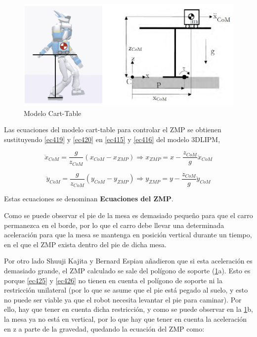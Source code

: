 \begin{figure}[H]
\centering
\includegraphics[scale=0.5]{imagenes/apartado_4/46_cart_table_model_2}
\caption{Modelo Cart-Table}
\label{figura46}
\end{figure}

Las ecuaciones del modelo cart-table para controlar el ZMP se obtienen sustituyendo \ref{ec419} y \ref{ec420} en \ref{ec415} y \ref{ec416} del modelo 3DLIPM,

\begin{equation}
\ddot{x}_{CoM}=\frac{g}{z_{CoM}}\left ( x_{CoM} - x_{ZMP} \right )\Rightarrow x_{ZMP} = x-\frac{z_{CoM}}{g}\ddot{x}_{CoM}
\label{ec425}
\end{equation}

\begin{equation}
\ddot{y}_{CoM}=\frac{g}{z_{CoM}}\left ( y_{CoM} - y_{ZMP} \right )\Rightarrow y_{ZMP} = y-\frac{z_{CoM}}{g}\ddot{y}_{CoM}
\label{ec426}
\end{equation}

Estas ecuaciones se denominan \textbf{Ecuaciones del ZMP}. 

Como se puede observar el pie de la mesa es demasiado pequeño para que el carro permanezca en el borde, por lo que el carro debe llevar una determinada aceleración para que la mesa se mantenga en posición vertical durante un tiempo, en el que el ZMP exista dentro del pie de dicha mesa.

Por otro lado Shuuji Kajita y Bernard Espiau \cite{ref20} añadieron que si esta aceleración es demasiado grande, el ZMP calculado se sale del polígono de soporte (\ref{figura46}a). Esto es porque \ref{ec425} y \ref{ec426} no tienen en cuenta el polígono de soporte ni la restricción unilateral (por lo que se asume que el pie está pegado al suelo, y esto no puede ser viable ya que el robot necesita levantar el pie para caminar). Por ello, hay que tener en cuenta dicha restricción, y como se puede observar en la \ref{figura46}b, la mesa ya no está en vertical, por lo que hay que tener en cuenta la aceleración en z a parte de la gravedad, quedando la ecuación del ZMP como:

